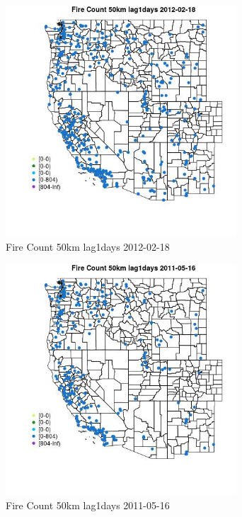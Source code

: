 \begin{figure} 
\centering  
\includegraphics[width=0.77\textwidth]{Code_Outputs/Report_ML_input_PM25_Step4_part_f_de_duplicated_aveswNAs_MapObsFire_Count_50km_lag1days2012-02-18.jpg} 
\caption{\label{fig:Report_ML_input_PM25_Step4_part_f_de_duplicated_aveswNAsMapObsFire_Count_50km_lag1days2012-02-18}Fire Count 50km lag1days 2012-02-18} 
\end{figure} 
 

\clearpage 

\begin{figure} 
\centering  
\includegraphics[width=0.77\textwidth]{Code_Outputs/Report_ML_input_PM25_Step4_part_f_de_duplicated_aveswNAs_MapObsFire_Count_50km_lag1days2011-05-16.jpg} 
\caption{\label{fig:Report_ML_input_PM25_Step4_part_f_de_duplicated_aveswNAsMapObsFire_Count_50km_lag1days2011-05-16}Fire Count 50km lag1days 2011-05-16} 
\end{figure} 
 

